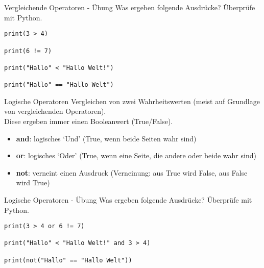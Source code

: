 \begin{frame}[fragile]{Vergleichende Operatoren - Übung}
Was ergeben folgende Ausdrücke? Überprüfe mit Python.

\begin{lstlisting} 
print(3 > 4) 

print(6 != 7)

print("Hallo" < "Hallo Welt!") 

print("Hallo" == "Hallo Welt")

\end{lstlisting}
\end{frame}



\begin{frame}[fragile]{Logische Operatoren}
Vergleichen von zwei Wahrheitswerten (meist auf Grundlage von vergleichenden Operatoren).\\
Diese ergeben immer einen Booleanwert (True/False).

\begin{itemize}	
\item \textbf{and}:  logisches `Und' (True, wenn beide Seiten wahr sind)
\item \textbf{or}: logisches `Oder' (True, wenn eine Seite, die andere oder beide wahr sind)
\item \textbf{not}:  verneint einen Ausdruck (Verneinung: aus True wird False, aus False wird True)
\end{itemize}
\end{frame}

\begin{frame}[fragile]{Logische Operatoren - Übung}
Was ergeben folgende Ausdrücke? Überprüfe mit Python.

\begin{lstlisting} 
print(3 > 4 or 6 != 7)

print("Hallo" < "Hallo Welt!" and 3 > 4)

print(not("Hallo" == "Hallo Welt"))
\end{lstlisting}
\end{frame}







